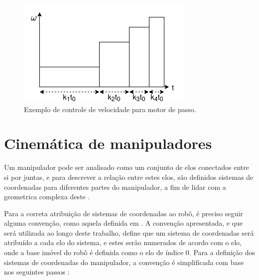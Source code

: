 \begin{figure}[h]
    \caption{Exemplo de controle de velocidade para motor de passo.}    

    \begin{centering}
        \includegraphics[width=0.5\columnwidth]{images/fundamentos/StepperSpeed.png} 
    \par\end{centering}

    \label{fig:stepperspeed}
\end{figure}



\section{Cinemática de manipuladores}
\label{sec:fundamentos-dh}

Um manipulador pode ser analisado como um conjunto de elos conectados
entre si por juntas, e para descrever a relação entre estes elos, 
são definidos sistemas de coordenadas para diferentes partes do 
manipulador, a fim de lidar com a geometrica complexa deste \cite{craig2009introduction}.

Para a correta atribuição de sistemas de coordenadas ao robô, é 
preciso seguir alguma convenção, como aquela definida em \cite{craig2009introduction}.
A convenção apresentada, e que será utilizada ao longo deste trabalho,
define que um sistema de coordenadas será atribuído a cada elo do sistema,
e estes serão numerados de acordo com o elo, onde a base imóvel do robô
é definida como o elo de índice 0. 
Para a definição dos sistemas de coordenadas do manipulador, a convenção é simplificada
com base nos seguintes passos \cite{craig2009introduction}:


